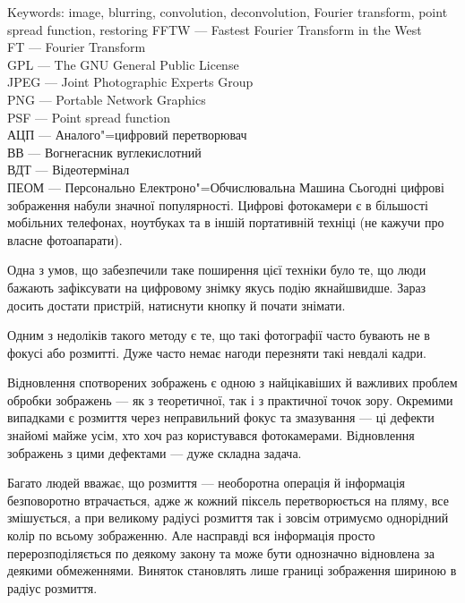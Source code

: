 \documentclass{diploma}
\begin{document}
  Keywords: image, blurring, convolution, deconvolution, Fourier transform,
  point spread function, restoring
  \clearpage
\maketitlepage
\shortings
FFTW --- Fastest Fourier Transform in the West\\
\noindent
FT --- Fourier Transform\\
\noindent
GPL --- The GNU General Public License\\
\noindent
JPEG --- Joint Photographic Experts Group\\
\noindent
PNG --- Portable Network Graphics\\
\noindent
PSF --- Point spread function\\
\noindent
АЦП --- Аналого"=цифровий перетворювач\\
\noindent
ВВ --- Вогнегасник вуглекислотний\\
\noindent
ВДТ --- Відеотермінал\\
\noindent
ПЕОМ --- Персонально Електроно"=Обчислювальна Машина
\clearpage
\intro
  Сьогодні цифрові зображення набули значної популярності.
  Цифрові фотокамери є в більшості мобільних телефонах, ноутбуках та в іншій
  портативній техніці (не кажучи про власне фотоапарати).

  Одна з умов, що забезпечили таке поширення цієї техніки було те, що люди
  бажають зафіксувати на цифровому знімку якусь подію якнайшвидше.
  Зараз досить достати пристрій, натиснути кнопку й почати знімати.

  Одним з недоліків такого методу є те, що такі фотографії часто бувають
  не в фокусі або розмитті.
  Дуже часто немає нагоди перезняти такі невдалі кадри.

  Відновлення спотворених зображень є одною з найцікавіших й важливих проблем
  обробки зображень --- як з теоретичної, так і з практичної точок зору.
  Окремими випадками є розмиття через неправильний фокус та змазування --- ці
  дефекти знайомі майже усім, хто хоч раз користувався фотокамерами.
  Відновлення зображень з цими дефектами --- дуже складна задача.

  Багато людей вважає, що розмиття --- необоротна операція й інформація
  безповоротно втрачається, адже ж кожний піксель перетворюється на пляму, все
  змішується, а при великому радіусі розмиття так і зовсім отримуємо
  однорідний колір по всьому зображенню.
  Але насправді вся інформація просто перерозподіляється по деякому закону та
  може бути однозначно відновлена за деякими обмеженнями.
  Виняток становлять лише границі зображення шириною в радіус розмиття.
\end{document}
